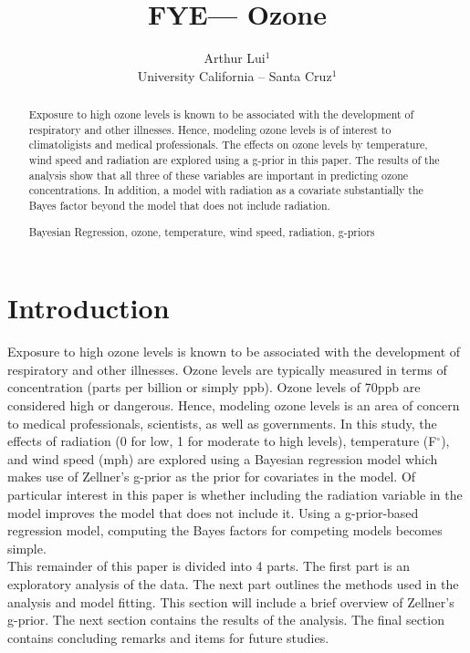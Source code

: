 \documentclass{../../tex_template/asaproc}
\title{FYE--- Ozone}
\author{
  Arthur Lui$^1$\\
  University California -- Santa Cruz$^1$\\
}
\begin{document}
\maketitle
\begin{abstract}
Exposure to high ozone levels is known to be associated with the development
of respiratory and other illnesses. Hence, modeling ozone levels is of interest
to climatoligists and medical professionals. The effects on ozone levels by
temperature, wind speed and radiation are explored using a g-prior in this 
paper. The results of the analysis show that all three of these variables are
important in predicting ozone concentrations. In addition, a model with
radiation as a covariate substantially the Bayes factor beyond the model
that does not include radiation.

\begin{keywords}
Bayesian Regression, ozone, temperature, wind speed, radiation, g-priors
\end{keywords}
\end{abstract}

\section{Introduction}
Exposure to high ozone levels is known to be associated with the development of
respiratory and other illnesses. Ozone levels are typically measured in terms
of concentration (parts per billion or simply ppb). Ozone levels of 70ppb are
considered high or dangerous. Hence, modeling ozone levels is an area of 
concern to medical professionals, scientists, as well as governments. In this
study, the effects of radiation (0 for low, 1 for moderate to high levels), 
temperature (F$^\circ$), and wind speed (mph) are explored using a Bayesian
regression model which makes use of Zellner's g-prior as the prior for covariates
in the model. Of particular interest in this paper is whether including the 
radiation variable in the model improves the model that does not include it.
Using a g-prior-based regression model, computing the Bayes factors for competing
models becomes simple.\\

This remainder of this paper is divided into 4 parts. The first part is an 
exploratory analysis of the data. The next part outlines the methods used in
the analysis and model fitting. This section will include a brief overview
of Zellner's g-prior. The next section contains the results of the analysis.
The final section contains concluding remarks and items for future studies.
\end{document}
